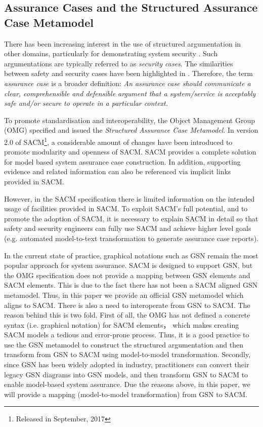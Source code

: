 \subsection{Assurance Cases and the Structured Assurance Case Metamodel}
There has been increasing interest in the use of structured argumentation in other domains, particularly for demonstrating system security \cite{bloomfield2010safety}. Such argumentations are typically referred to as \textit{security cases}. The similarities between safety and security cases have been highlighted in \cite{lautieri2005safsec}. Therefore, the term \textit{assurance case} is a broader definition: \textit{An assurance case should communicate a clear, comprehensible and defensible argument that a system/service is acceptably safe and/or secure to operate in a particular context.} 

To promote standardisation and interoperability, the Object Management Group (OMG) specified and issued the \textit{Structured Assurance Case Metamodel}. In version 2.0 of SACM\footnote{Released in September, 2017}, a considerable amount of changes have been introduced to promote modularity and openness of SACM. SACM provides a complete solution for model based system assurance case construction. In addition, supporting evidence and related information can also be referenced via implicit links provided in SACM.

However, in the SACM specification there is limited information on the intended usage of facilities provided in SACM. To exploit SACM's full potential, and to promote the adoption of SACM, it is necessary to explain SACM in detail so that safety and security engineers can fully use SACM  and achieve higher level goals (e.g. automated model-to-text transformation to generate assurance case reports). 

In the current state of practice, graphical notations such as GSN remain the most popular approach for system assurance. 
SACM is designed to support GSN, but the OMG specification does not provide a mapping between GSN elements and SACM elements. 
This is due to the fact there has not been a SACM aligned GSN metamodel. 
Thus, in this paper we provide an official GSN metamodel which aligns to SACM. 
There is also a need to interoperate from GSN to SACM.
The reason behind this is two fold. First of all, the OMG has not defined a concrete syntax (i.e. graphical notation) for SACM elements， which makes creating SACM models a tedious and error-prone process. Thus, it is a good practice to use the GSN metamodel to construct the structured argumentation and then transform from GSN to SACM using model-to-model transformation. Secondly, since GSN has been widely adopted in industry, practitioners can convert their legacy GSN diagrams into GSN models, and then transform GSN to SACM to enable model-based system assurance. 
Due the reasons above, in this paper, we will provide a mapping (model-to-model transformation) from GSN to SACM.

